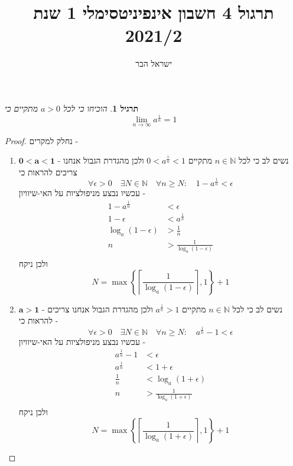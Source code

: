\documentclass{article}
\begin{document}
\title{תרגול 4 חשבון אינפיניטסימלי 1 שנת 2021/2}
\author{ישראל הבר}
\maketitle

\newtheorem{theorem}{משפט}
\newtheorem{exercise}{תרגיל}
\newtheorem{homeexercise}{תרגיל לבית}
\newtheorem{example}{דוגמה}
\theoremstyle{definition}
\newtheorem{definition}{הגדרה}
\newtheorem{notation}{סימון}
\newtheorem{claim}{טענה}
\newtheorem{comment}{\emph{הערה}}
\renewcommand\qedsymbol{$\blacksquare$}
\newcommand{\limtoinfty}{\underset{n\rightarrow\infty}{\lim}}
\newcommand{\goesto}{\underset{n\rightarrow\infty}{\longrightarrow}}
\newcommand{\goesfrom}{\underset{n\rightarrow\infty}{\longleftarrow}}

\begin{exercise}
הוכיחו כי לכל 
$a>0$
מתקיים כי 
\[\limtoinfty a^{\frac{1}{n}} = 1\]
\end{exercise}
\begin{proof}
נחלק למקרים - 
\begin{enumerate}
	\item $\mathbf{0<a<1}$ - \newline \newline
	נשים לב כי לכל 
$n\in\mathbb{N}$
מתקיים 
$0<a^{\frac{1}{n}}<1$
ולכן מהגדרת הגבול אנחנו צריכים להראות כי 
\[\forall\epsilon>0 \quad \exists N\in\mathbb{N}\quad \forall n\geq N: \quad 1 - a^{\frac{1}{n}}<\epsilon \]
עכשיו נבצע מניפולציות על האי-שיוויון -
\begin{align*}
1-a^{\frac{1}{n}}&<\epsilon \\
1-\epsilon&< a^{\frac{1}{n}} \\
\log_a(1-\epsilon)&>\frac{1}{n} \\
n&>\frac{1}{\log_a(1-\epsilon)} \\
\end{align*}
ולכן ניקח 
\[N=\max\left\{\left\lceil\frac{1}{\log_a(1-\epsilon)}\right\rceil, 1\right\} + 1\]
\item $\mathbf{a>1}$ - \newline \newline
	נשים לב כי לכל 
$n\in\mathbb{N}$
מתקיים 
$a^{\frac{1}{n}}>1$
ולכן מהגדרת הגבול אנחנו צריכים להראות כי - 
\[\forall\epsilon>0 \quad \exists N\in\mathbb{N}\quad \forall n\geq N: \quad a^{\frac{1}{n}}-1<\epsilon \]
עכשיו נבצע מניפולציות על האי-שיוויון -
\begin{align*}
a^{\frac{1}{n}} - 1&<\epsilon \\
a^{\frac{1}{n}}&< 1+\epsilon \\
\frac{1}{n}&<\log_a(1+\epsilon) \\
n&>\frac{1}{\log_a(1+\epsilon)} \\
\end{align*}
ולכן ניקח 
\[N=\max\left\{\left\lceil\frac{1}{\log_a(1+\epsilon)}\right\rceil, 1\right\} + 1\]
\end{enumerate}
\end{proof}
\end{document}
